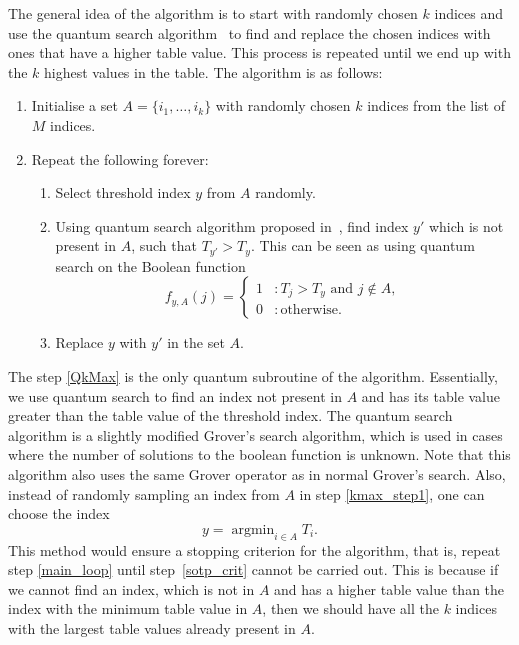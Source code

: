 \documentclass[a4paper,twocolumn,11pt,unpublished]{quantumarticle}
\DeclareMathOperator*{\argmin}{argmin}
\begin{document}
        
        The general idea of the algorithm is to start with randomly chosen $k$ indices and use the quantum search algorithm~\cite{Boyer2005} to find and replace the chosen indices with ones that have a higher table value. This process is repeated until we end up with the $k$ highest values in the table.
        The algorithm is as follows: 
        \begin{enumerate} \label{algo2}
            \item Initialise a set $A = \{i_1, \ldots, i_k\}$ with randomly chosen $k$ indices from the list of $M$ indices.

            \item Repeat the following forever: \label{main_loop}
            
            \begin{enumerate}
                \item Select threshold index $y$ from $A$ randomly. \label{kmax_step1}
                \item \label{QkMax} Using quantum search algorithm proposed in~\cite{Boyer2005}, find index $y'$ which is not present in $A$, such that $T_{y'} > T_{y}$. This can be seen as using quantum search on the Boolean function
                \begin{equation}
                    f_{y,A}(j)  = 
                    \begin{cases}
                        1 &: T_j > T_y \text{ and } j \notin A,\\
                        0 &: \text{otherwise}.                        
                    \end{cases}
                \end{equation}
                \label{sotp_crit}
                \item Replace $y$ with $y'$ in the set $A$. 
            \end{enumerate}
        \end{enumerate}
        The step \ref{QkMax} is the only quantum subroutine of the algorithm. Essentially, we use quantum search to find an index not present in $A$ and has its table value greater than the table value of the threshold index. The quantum search algorithm is a slightly modified Grover's search algorithm, which is used in cases where the number of solutions to the boolean function is unknown. Note that this algorithm also uses the same Grover operator as in normal Grover's search. Also, instead of randomly sampling an index from $A$ in step \ref{kmax_step1}, one can choose the index \[y = \argmin_{i \in {A}} T_i.\]
        This method would ensure a stopping criterion for the algorithm, that is, repeat step \ref{main_loop} until step~\ref{sotp_crit} cannot be carried out. This is because if we cannot find an index, which is not in $A$ and has a higher table value than the index with the minimum table value in $A$, then we should have all the $k$ indices with the largest table values already present in $A$.
    
\end{document}
